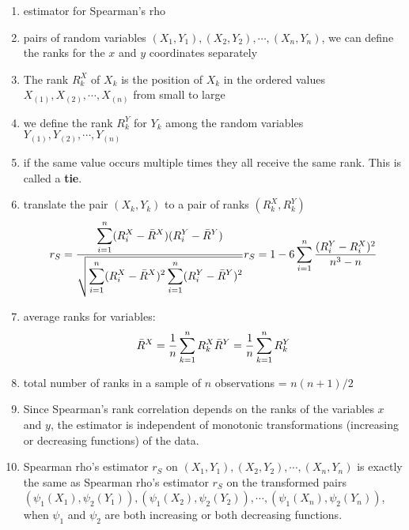 \begin{enumerate}
    \item estimator for Spearman’s rho

    \item pairs of random variables $(X_1, Y_1), (X_2, Y_2), \cdots , (X_n, Y_n)$, we can define the ranks for the $x$ and $y$ coordinates separately

    \item The rank $R_k^X$ of $X_k$ is the position of $X_k$ in the ordered values $X_{(1)}, X_{(2)}, \cdots, X_{(n)}$ from small to large

    \item we define the rank $R_k^Y$ for $Y_k$ among the random variables $Y_{(1)}, Y_{(2)},\cdots, Y_{(n)}$

    \item if the same value occurs multiple times they all receive the same rank. This is called a \textbf{tie}.

    \item translate the pair $(X_k, Y_k)$ to a pair of ranks $(R_k^X, R_k^Y)$
    \[
        \hfill
        r_S
        =\dfrac{
            \dsum_{i=1}^{n} 
            (R_i^X - \bar{R}^X)(R_i^Y - \bar{R}^Y)
        }{\sqrt{
            \dsum_{i=1}^{n} 
            (R_i^X - \bar{R}^X)^2
            \dsum_{i=1}^{n} 
            (R_i^Y - \bar{R}^Y)^2
        }}
        \hfill
        r_S
        = 1 - 6\dsum_{i=1}^{n}
        \dfrac{(R_i^Y - R_i^X)^2}{n^3 - n}
        \hfill
    \] 

    \item average ranks for variables:
    \[
        \hfill
        \bar{R}^X = \dfrac{1}{n} \dsum_{k=1}^{n} R_k^X
        \hfill
        \bar{R}^Y = \dfrac{1}{n} \dsum_{k=1}^{n} R_k^Y
        \hfill
    \]

    \item total number of ranks in a sample of $n$ observations = $n(n + 1)/2$

    \item Since Spearman’s rank correlation depends on the ranks of the variables $x$ and $y$, the estimator is independent of monotonic transformations (increasing or decreasing functions) of the data.

    \item Spearman rho’s estimator $r_S$ on $(X_1, Y_1), (X_2, Y_2), \cdots , (X_n, Y_n)$ is exactly the same as Spearman rho’s estimator $r_S$ on the transformed pairs $(\psi_1(X_1), \psi_2(Y_1)), (\psi_1(X_2), \psi_2(Y_2)), \cdots , (\psi_1(X_n), \psi_2(Y_n))$, when $\psi_1$ and $\psi_2$ are both increasing or both decreasing functions.

\end{enumerate}

